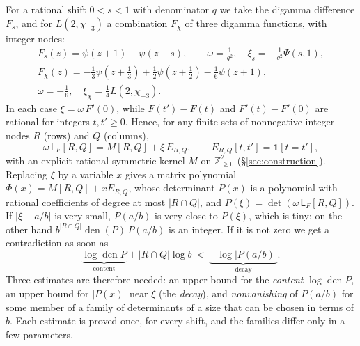\documentclass[11pt]{amsart}
\theoremstyle{definition}
\theoremstyle{remark}
\numberwithin{equation}{section}
\newcommand{\Z}{\mathbb Z}
\newcommand{\den}{\operatorname{den}}
\newcommand{\Lw}{\mathsf L}          %
\begin{document}
For a rational shift $0<s<1$ with denominator $q$ we take the digamma difference $F_s$, and for $L(2,\chi_{-3})$ a
combination $F_\chi$ of three digamma functions, with integer nodes:
\begin{equation}\label{eq:frames}
\begin{gathered}
 F_s(z)=\psi(z+1)-\psi(z+s),\qquad \omega=\tfrac1{q^2},\quad \xi_s=-\tfrac1{q^2}\Psi(s,1),\\
 F_{\chi}(z)=-\tfrac13\psi(z+\tfrac13)+\tfrac12\psi(z+\tfrac12)-\tfrac16\psi(z+1),\\
 \omega=-\tfrac16,\quad \xi_\chi=\tfrac14L(2,\chi_{-3}).
\end{gathered}
\end{equation}
In each case $\xi=\omega\,F'(0)$, while $F(t')-F(t)$ and $F'(t)-F'(0)$ are rational for integers $t,t'\ge0$. Hence, for
any finite sets of nonnegative integer nodes $R$ (rows) and $Q$ (columns),
\begin{equation}\label{eq:shift}
 \omega\,\Lw_F[R,Q]=M[R,Q]+\xi\,E_{R,Q},\qquad E_{R,Q}[t,t']=\mathbf 1[t=t'],
\end{equation}
with an explicit rational symmetric kernel $M$ on $\Z_{\ge0}^2$ (\S\ref{sec:construction}). Replacing $\xi$ by
a variable $x$ gives a matrix polynomial $\Phi(x)=M[R,Q]+xE_{R,Q}$, whose determinant $P(x)$ is a polynomial
with rational coefficients of degree at most $|R\cap Q|$, and $P(\xi)=\det(\omega\,\Lw_F[R,Q])$. If
$|\xi-a/b|$ is very small, $P(a/b)$ is very close to $P(\xi)$, which is tiny; on the other hand
$b^{|R\cap Q|}\den(P)\,P(a/b)$ is an integer. If it is not zero we get a contradiction as soon as
\[
 \underbrace{\log\den P}_{\text{content}}+|R\cap Q|\log b\ <\ \underbrace{-\log|P(a/b)|}_{\text{decay}} .
\]
Three estimates are therefore needed: an upper bound for the \emph{content} $\log\den P$, an upper bound
for $|P(x)|$ near $\xi$ (the \emph{decay}), and \emph{nonvanishing} of $P(a/b)$ for some member of a family of
determinants of a size that can be chosen in terms of $b$. Each estimate is proved once, for every shift, and the
families differ only in a few parameters.
\end{document}
